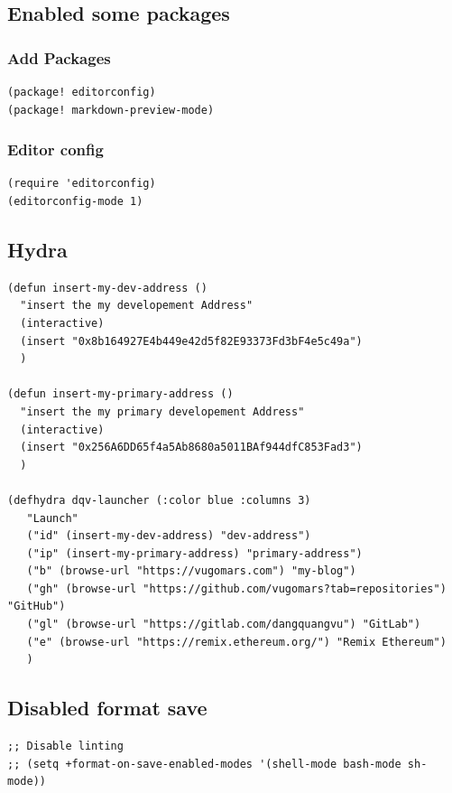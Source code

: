 \documentclass[11pt]{article}
\begin{document}
\subsection{Enabled some packages}
\label{sec:orgfa72a3f}
\subsubsection{Add Packages}
\label{sec:org6154d64}
\begin{verbatim}
(package! editorconfig)
(package! markdown-preview-mode)
\end{verbatim}

\subsubsection{Editor config}
\label{sec:orga92dc19}
\begin{verbatim}
(require 'editorconfig)
(editorconfig-mode 1)
\end{verbatim}

\subsection{Hydra}
\label{sec:org82959f4}
\begin{verbatim}
(defun insert-my-dev-address ()
  "insert the my developement Address"
  (interactive)
  (insert "0x8b164927E4b449e42d5f82E93373Fd3bF4e5c49a")
  )

(defun insert-my-primary-address ()
  "insert the my primary developement Address"
  (interactive)
  (insert "0x256A6DD65f4a5Ab8680a5011BAf944dfC853Fad3")
  )

(defhydra dqv-launcher (:color blue :columns 3)
   "Launch"
   ("id" (insert-my-dev-address) "dev-address")
   ("ip" (insert-my-primary-address) "primary-address")
   ("b" (browse-url "https://vugomars.com") "my-blog")
   ("gh" (browse-url "https://github.com/vugomars?tab=repositories") "GitHub")
   ("gl" (browse-url "https://gitlab.com/dangquangvu") "GitLab")
   ("e" (browse-url "https://remix.ethereum.org/") "Remix Ethereum")
   )
\end{verbatim}

\subsection{Disabled format save}
\label{sec:org32e3c34}
\begin{verbatim}
;; Disable linting
;; (setq +format-on-save-enabled-modes '(shell-mode bash-mode sh-mode))
\end{verbatim}
\end{document}
